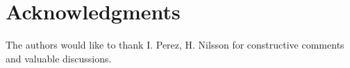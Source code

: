 \section*{Acknowledgments}
The authors would like to thank I. Perez, H. Nilsson for constructive comments and valuable discussions.